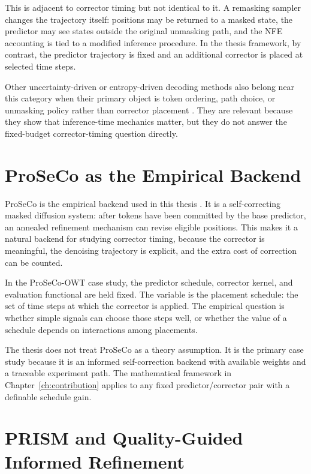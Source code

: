 This is adjacent to corrector timing but not identical to it. A remasking
sampler changes the trajectory itself: positions may be returned to a masked
state, the predictor may see states outside the original unmasking path, and
the NFE accounting is tied to a modified inference procedure. In the thesis
framework, by contrast, the predictor trajectory is fixed and an additional
corrector is placed at selected time steps.

Other uncertainty-driven or entropy-driven decoding methods also belong near
this category when their primary object is token ordering, path choice, or
unmasking policy rather than corrector placement
\parencite{chen2025denoisingentropy,benhamu2025ebsampler,kim2025tokenordering,kim2025klass,hong2025upo,he2025mdpo}.
They are relevant because they show that inference-time mechanics matter, but
they do not answer the fixed-budget corrector-timing question directly.

\section{ProSeCo as the Empirical Backend}
\label{sec:ch4-proseco}

ProSeCo is the empirical backend used in this thesis
\parencite{schiff2026proseco}. It is a self-correcting masked diffusion system:
after tokens have been committed by the base predictor, an annealed refinement
mechanism can revise eligible positions. This makes it a natural backend for
studying corrector timing, because the corrector is meaningful, the denoising
trajectory is explicit, and the extra cost of correction can be counted.

In the ProSeCo-OWT case study, the predictor schedule, corrector kernel, and
evaluation functional are held fixed. The variable is the placement schedule:
the set of time steps at which the corrector is applied. The empirical
question is whether simple signals can choose those steps well, or whether the
value of a schedule depends on interactions among placements.

The thesis does not treat ProSeCo as a theory assumption. It is the primary
case study because it is an informed self-correction backend with available
weights and a traceable experiment path. The mathematical framework in
Chapter~\ref{ch:contribution} applies to any fixed predictor/corrector pair
with a definable schedule gain.

\section{PRISM and Quality-Guided Informed Refinement}
\label{sec:ch4-prism}

